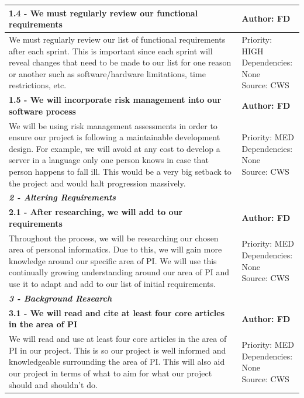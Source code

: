 \documentclass[10pt]{report}
\begin{document}
\begin{center}
\begin{longtable}{| p{13cm} | p{3cm} |}
\hline
\textbf{1.4 - We must regularly review our functional requirements} & \textbf{Author: FD} \\
\hline
We must regularly review our list of functional requirements after each sprint. This is important since each sprint will reveal changes that need to be made to our list for one reason or another such as software/hardware limitations, time restrictions, etc.&
\makecell{Priority: HIGH\\Dependencies: None\\Source: CWS}\\
\hline
\textbf{1.5 - We will incorporate risk management into our software process} & \textbf{Author: FD} \\
\hline
We will be using risk management assessments in order to ensure our project is following a maintainable development design. For example, we will avoid at any cost to develop a server in a language only one person knows in case that person happens to fall ill. This would be a very big setback to the project and would halt progression massively.&
\makecell{Priority: MED\\Dependencies: None\\Source: CWS}\\
\hline

\multicolumn{2}{|l|}{\textbf{\textit{2 - Altering Requirements}}} \\
\hline
\textbf{2.1 - After researching, we will add to our requirements} & \textbf{Author: FD} \\
\hline
Throughout the process, we will be researching our chosen area of personal informatics. Due to this, we will gain more knowledge around our specific area of PI. We will use this continually growing understanding around our area of PI and use it to adapt and add to our list of initial requirements.&
\makecell{Priority: MED\\Dependencies: None\\Source: CWS}\\
\hline

\multicolumn{2}{|l|}{\textbf{\textit{3 - Background Research}}} \\
\hline
\textbf{3.1 - We will read and cite at least four core articles in the area of PI} & \textbf{Author: FD} \\
\hline
We will read and use at least four core articles in the area of PI in our project. This is so our project is well informed and knowledgeable surrounding the area of PI. This will also aid our project in terms of what to aim for what our project should and shouldn’t do.&
\makecell{Priority: MED\\Dependencies: None\\Source: CWS}\\
\hline


\end{longtable}
\end{center}
\end{document}
